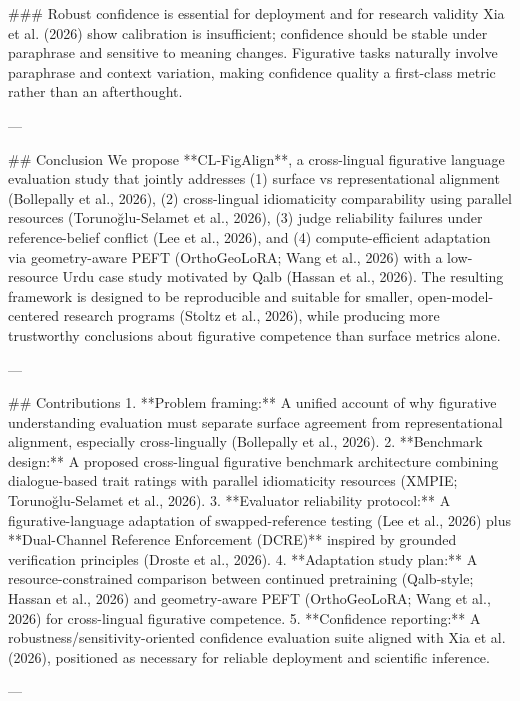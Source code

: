 ### Robust confidence is essential for deployment and for research validity  
Xia et al. (2026) show calibration is insufficient; confidence should be stable under paraphrase and sensitive to meaning changes. Figurative tasks naturally involve paraphrase and context variation, making confidence quality a first-class metric rather than an afterthought.

---

## Conclusion  
We propose **CL-FigAlign**, a cross-lingual figurative language evaluation study that jointly addresses (1) surface vs representational alignment (Bollepally et al., 2026), (2) cross-lingual idiomaticity comparability using parallel resources (Torunoğlu-Selamet et al., 2026), (3) judge reliability failures under reference-belief conflict (Lee et al., 2026), and (4) compute-efficient adaptation via geometry-aware PEFT (OrthoGeoLoRA; Wang et al., 2026) with a low-resource Urdu case study motivated by Qalb (Hassan et al., 2026). The resulting framework is designed to be reproducible and suitable for smaller, open-model-centered research programs (Stoltz et al., 2026), while producing more trustworthy conclusions about figurative competence than surface metrics alone.

---

## Contributions  
1. **Problem framing:** A unified account of why figurative understanding evaluation must separate surface agreement from representational alignment, especially cross-lingually (Bollepally et al., 2026).  
2. **Benchmark design:** A proposed cross-lingual figurative benchmark architecture combining dialogue-based trait ratings with parallel idiomaticity resources (XMPIE; Torunoğlu-Selamet et al., 2026).  
3. **Evaluator reliability protocol:** A figurative-language adaptation of swapped-reference testing (Lee et al., 2026) plus **Dual-Channel Reference Enforcement (DCRE)** inspired by grounded verification principles (Droste et al., 2026).  
4. **Adaptation study plan:** A resource-constrained comparison between continued pretraining (Qalb-style; Hassan et al., 2026) and geometry-aware PEFT (OrthoGeoLoRA; Wang et al., 2026) for cross-lingual figurative competence.  
5. **Confidence reporting:** A robustness/sensitivity-oriented confidence evaluation suite aligned with Xia et al. (2026), positioned as necessary for reliable deployment and scientific inference.

---